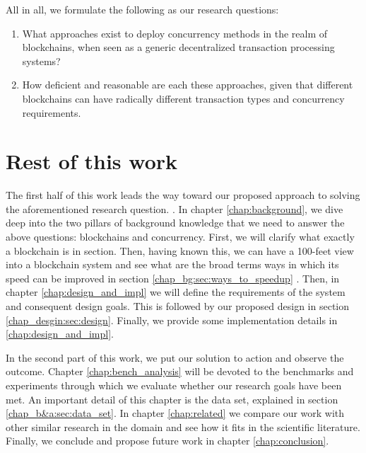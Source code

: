  All in all, we formulate the following as our research questions: 
 
 \begin{enumerate}
     \item What approaches exist to deploy concurrency methods in the realm of blockchains, when seen as a generic decentralized transaction processing systems?
     \item How deficient and reasonable are each these approaches, given that different blockchains can have radically different transaction types and concurrency requirements. 
 \end{enumerate}
 
\section{Rest of this work}

The first half of this work leads the way toward our proposed approach to solving the aforementioned research question. . In chapter \ref{chap:background}, we dive deep into the two pillars of background knowledge that we need to answer the above questions: blockchains and concurrency. First, we will clarify what exactly a blockchain is in section. Then, having known this, we can have a 100-feet view into a blockchain system and see what are the broad terms ways in which its speed can be improved in section \ref{chap_bg:sec:ways_to_speedup}
. Then, in chapter \ref{chap:design_and_impl} we will define the requirements of the system and consequent design goals. This is followed by our proposed design in section \ref{chap_desgin:sec:design}. Finally, we provide some implementation details in \ref{chap:design_and_impl}. 

In the second part of this work, we put our solution to action and observe the outcome. Chapter \ref{chap:bench_analysis} will be devoted to the benchmarks and experiments through which we evaluate whether our research goals have been met. An important detail of this chapter is the data set, explained in section \ref{chap_b&a:sec:data_set}. In chapter \ref{chap:related} we compare our work with other similar research in the domain and see how it fits in the scientific literature. Finally, we conclude and propose future work in chapter \ref{chap:conclusion}.

